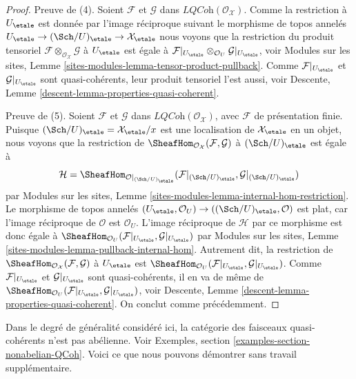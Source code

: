 \begin{proof}
\medskip\noindent
Preuve de (4). Soient $\mathcal{F}$ et $\mathcal{G}$ dans
$\textit{LQCoh}(\mathcal{O}_\mathcal{X})$. Comme la restriction à $U_\etale$
est donnée par l'image réciproque suivant le morphisme de topos annelés
$U_\etale \to (\Sch/U)_\etale \to \mathcal{X}_\etale$
nous voyons que la restriction du produit tensoriel
$\mathcal{F} \otimes_{\mathcal{O}_\mathcal{X}} \mathcal{G}$
à $U_\etale$ est égale à
$\mathcal{F}|_{U_\etale} \otimes_{\mathcal{O}_U} \mathcal{G}|_{U_\etale}$,
voir Modules sur les sites, Lemme \ref{sites-modules-lemma-tensor-product-pullback}.
Comme $\mathcal{F}|_{U_\etale}$ et $\mathcal{G}|_{U_\etale}$
sont quasi-cohérents, leur produit tensoriel l'est aussi, voir
Descente, Lemme \ref{descent-lemma-properties-quasi-coherent}.

\medskip\noindent
Preuve de (5). Soient $\mathcal{F}$ et $\mathcal{G}$ dans
$\textit{LQCoh}(\mathcal{O}_\mathcal{X})$, avec $\mathcal{F}$
de présentation finie. Puisque
$(\Sch/U)_\etale = \mathcal{X}_\etale/x$
est une localisation de $\mathcal{X}_\etale$ en un objet,
nous voyons que la restriction de
$\SheafHom_{\mathcal{O}_\mathcal{X}}(\mathcal{F}, \mathcal{G})$
à $(\Sch/U)_\etale$ est égale à
$$
\mathcal{H} =
\SheafHom_{\mathcal{O}|_{(\Sch/U)_\etale}}(
\mathcal{F}|_{(\Sch/U)_\etale}, \mathcal{G}|_{(\Sch/U)_\etale})
$$
par Modules sur les sites, Lemme \ref{sites-modules-lemma-internal-hom-restriction}.
Le morphisme de topos annelés
$(U_\etale, \mathcal{O}_U) \to ((\Sch/U)_\etale, \mathcal{O})$
est plat, car l'image réciproque de $\mathcal{O}$ est $\mathcal{O}_U$.
L'image réciproque de $\mathcal{H}$ par ce morphisme est donc égale à
$\SheafHom_{\mathcal{O}_U}(\mathcal{F}|_{U_\etale}, \mathcal{G}|_{U_\etale})$
par Modules sur les sites, Lemme \ref{sites-modules-lemma-pullback-internal-hom}.
Autrement dit, la restriction de
$\SheafHom_{\mathcal{O}_\mathcal{X}}(\mathcal{F}, \mathcal{G})$
à $U_\etale$ est
$\SheafHom_{\mathcal{O}_U}(\mathcal{F}|_{U_\etale}, \mathcal{G}|_{U_\etale})$.
Comme $\mathcal{F}|_{U_\etale}$ et $\mathcal{G}|_{U_\etale}$
sont quasi-cohérents, il en va de même de
$\SheafHom_{\mathcal{O}_U}(\mathcal{F}|_{U_\etale}, \mathcal{G}|_{U_\etale})$,
voir Descente, Lemme \ref{descent-lemma-properties-quasi-coherent}.
On conclut comme précédemment.
\end{proof}

\noindent
Dans le degré de généralité considéré ici, la catégorie des faisceaux quasi-cohérents
n'est pas abélienne. Voir Exemples, section \ref{examples-section-nonabelian-QCoh}.
Voici ce que nous pouvons démontrer sans travail supplémentaire.

